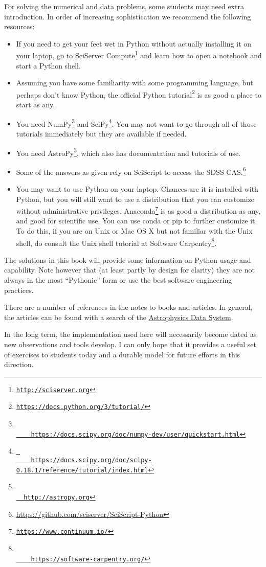 \documentclass[11pt, preprint, maxnames=9]{aastex}
\begin{document}
For solving the numerical and data problems, some students may need
extra introduction. In order of increasing sophistication we recommend
the following resources:
\begin{itemize}
\item If you need to get your feet wet in Python without actually
  installing it on your laptop, go to SciServer
  Compute\footnote{\tt \url{http://sciserver.org}} and learn how to
  open a notebook and start a Python shell.
\item Assuming you have some familiarity with some programming
  language, but perhaps don't know Python, the official Python
  tutorial\footnote{\tt \url{https://docs.python.org/3/tutorial/}} is as
  good a place to start as any.
\item You need 
  NumPy\footnote{\tt \url{
    https://docs.scipy.org/doc/numpy-dev/user/quickstart.html}} and
  SciPy\footnote{\tt \url{ 
    https://docs.scipy.org/doc/scipy-0.18.1/reference/tutorial/index.html}}. You
  may not want to go through all of those tutorials immediately but
  they are available if needed. 
\item You need AstroPy\footnote{\tt \url{
  http://astropy.org}}, which also has documentation and tutorials of
  use.
\item Some of the answers as given rely on SciScript to access the
  SDSS
  CAS.\footnote{\url{https://github.com/sciserver/SciScript-Python}}
\item You may want to use Python on your laptop. Chances are it is
  installed with Python, but you will still want to use a distribution
  that you can customize without administrative
  privileges. Anaconda\footnote{\tt \url{https://www.continuum.io/}} is as
  good a distribution as any, and good for scientific use. You can use
  conda or pip to further customize it. To do this, if you are on Unix
  or Mac OS X but not familiar with the Unix shell, do consult the
  Unix shell tutorial at Software Carpentry\footnote{\tt \url{
    https://software-carpentry.org/}}.
\end{itemize}
The solutions in this book will provide some information on Python
usage and capability. Note however that (at least partly by design for
clarity) they are not always in the most ``Pythonic'' form or use the
best software engineering practices.

There are a number of references in the notes to books and
articles. In general, the articles can be found with a search of the
\href{https://ui.adsabs.harvard.edu}{Astrophysics Data System}.

In the long term, the implementation used here will necessarily become
dated as new observations and tools develop. I can only hope that it
provides a useful set of exercises to students today and a durable
model for future efforts in this direction.
\end{document}
